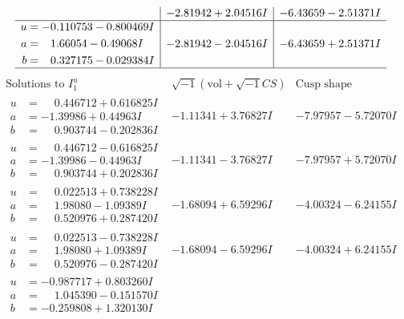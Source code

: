 \documentclass[1p]{elsarticle_modified}
\theoremstyle{definition}
\newcommand{\I}{\sqrt{-1}}
\begin{document}
$$\begin{array}{c|c|c}
 & -2.81942 + 2.04516 I & -6.43659 - 2.51371 I \\ \hline\begin{aligned}
u &= -0.110753 - 0.800469 I \\
a &= \phantom{-}1.66054 - 0.49068 I \\
b &= \phantom{-}0.327175 - 0.029384 I\end{aligned}
 & -2.81942 - 2.04516 I & -6.43659 + 2.51371 I\\
 \hline 
 \end{array}$$\newpage$$\begin{array}{c|c|c}  
\text{Solutions to }I^u_{1}& \I (\text{vol} + \sqrt{-1}CS) & \text{Cusp shape}\\
 \hline 
\begin{aligned}
u &= \phantom{-}0.446712 + 0.616825 I \\
a &= -1.39986 + 0.44963 I \\
b &= \phantom{-}0.903744 - 0.202836 I\end{aligned}
 & -1.11341 + 3.76827 I & -7.97957 - 5.72070 I \\ \hline\begin{aligned}
u &= \phantom{-}0.446712 - 0.616825 I \\
a &= -1.39986 - 0.44963 I \\
b &= \phantom{-}0.903744 + 0.202836 I\end{aligned}
 & -1.11341 - 3.76827 I & -7.97957 + 5.72070 I \\ \hline\begin{aligned}
u &= \phantom{-}0.022513 + 0.738228 I \\
a &= \phantom{-}1.98080 - 1.09389 I \\
b &= \phantom{-}0.520976 + 0.287420 I\end{aligned}
 & -1.68094 + 6.59296 I & -4.00324 - 6.24155 I \\ \hline\begin{aligned}
u &= \phantom{-}0.022513 - 0.738228 I \\
a &= \phantom{-}1.98080 + 1.09389 I \\
b &= \phantom{-}0.520976 - 0.287420 I\end{aligned}
 & -1.68094 - 6.59296 I & -4.00324 + 6.24155 I \\ \hline\begin{aligned}
u &= -0.987717 + 0.803260 I \\
a &= \phantom{-}1.045390 - 0.151570 I \\
b &= -0.259808 + 1.320130 I\end{aligned}

\end{array}$$
\end{document}

